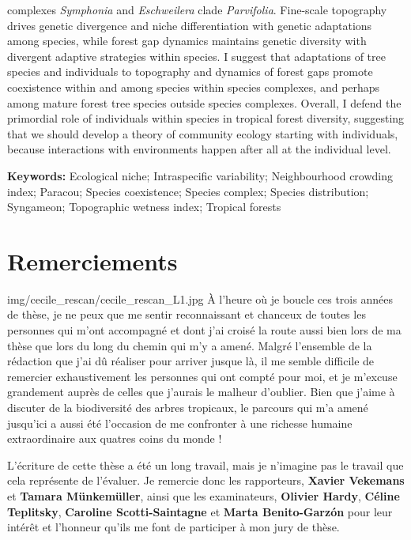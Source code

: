 \documentclass[12pt,twoside,a4paper, a]{article}
\let\oldsection\section
\renewcommand\section{\clearpage\oldsection}
\begin{document}
{complexes \emph{Symphonia} and \emph{Eschweilera} clade \emph{Parvifolia}. Fine-scale topography drives genetic divergence and niche differentiation with genetic adaptations among species, while forest gap dynamics maintains genetic diversity with divergent adaptive strategies within species. I suggest that adaptations of tree species and individuals to topography and dynamics of forest gaps promote coexistence within and among species within species complexes, and perhaps among mature forest tree species outside species complexes. Overall, I defend the primordial role of individuals within species in tropical forest diversity, suggesting that we should develop a theory of community ecology starting with individuals, because interactions with environments happen after all at the individual level. 

  \textbf{Keywords:}
  Ecological niche; Intraspecific variability; Neighbourhood crowding index; Paracou; Species coexistence; Species complex; Species distribution; Syngameon; Topographic wetness index;   Tropical forests

  }
  \vfill\null
% 

\newpage


\hypertarget{remerciements}{%
\section{Remerciements}\label{remerciements}}

\lettrine[lines=8, lraise=0.05, findent=.5em, image=true]{img/cecile_rescan/cecile_rescan_L1.jpg}{} À l'heure où je boucle ces trois années de thèse, je ne peux que me
sentir reconnaissant et chanceux de toutes les personnes qui m'ont
accompagné et dont j'ai croisé la route aussi bien lors de ma thèse que
lors du long du chemin qui m'y a amené. Malgré l'ensemble de la
rédaction que j'ai dû réaliser pour arriver jusque là, il me semble
difficile de remercier exhaustivement les personnes qui ont compté pour
moi, et je m'excuse grandement auprès de celles que j'aurais le malheur
d'oublier. Bien que j'aime à discuter de la biodiversité des arbres
tropicaux, le parcours qui m'a amené jusqu'ici a aussi été l'occasion de
me confronter à une richesse humaine extraordinaire aux quatres coins du
monde !

L'écriture de cette thèse a été un long travail, mais je n'imagine pas
le travail que cela représente de l'évaluer. Je remercie donc les
rapporteurs, \textbf{Xavier Vekemans} et \textbf{Tamara Münkemüller}, ainsi que les
examinateurs, \textbf{Olivier Hardy}, \textbf{Céline Teplitsky}, \textbf{Caroline
Scotti-Saintagne} et \textbf{Marta Benito-Garzón} pour leur intérêt et
l'honneur qu'ils me font de participer à mon jury de thèse.
\end{document}
